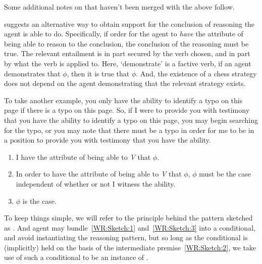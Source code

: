 \begin{note}
  {
    \color{red}
    Some additional notes on \AR{} that haven't been merged with the above follow.
  }
\end{note}

\begin{note}[Compatibility]
  \AR{} suggests an alternative way to obtain support for the conclusion of reasoning the agent is able to do.
  Specifically, if order for the agent to \emph{have} the attribute of being able to reason to the conclusion, the conclusion of the reasoning must be true.
  The relevant entailment is in part secured by the verb chosen, and in part by what the verb is applied to.
  Here, `demonstrate' is a factive verb, if an agent demonstrates that \(\phi\), then it is true that \(\phi\).
  And, the existence of a chess strategy does not depend on the agent demonstrating that the relevant strategy exists.

  To take another example, you only have the ability to identify a typo on this page if there is a typo on this page.
  So, if I were to provide you with testimony that you have the ability to identify a typo on this page, you may begin searching for the typo, or you may note that there must be a typo in order for me to be in a position to provide you with testimony that you have the ability.
\end{note}

\begin{note}[Sketch of \AR{}]
  \begin{enumerate}[label=(\textsf{A}\arabic*), ref=(\textsf{A}\arabic*)]
  \item\label{AR:Sketch:1} I have the attribute of being able to \emph{V} that \(\phi\).
  \item\label{AR:Sketch:2} In order to have the attribute of being able to \emph{V} that \(\phi\), \(\phi\) must be the case independent of whether or not I witness the ability.
  \item\label{AR:Sketch:3} \(\phi\) is the case.
  \end{enumerate}

  To keep things simple, we will refer to the principle behind the pattern sketched as \AR{}.
  And agent may bundle~\ref{WR:Sketch:1} and~\ref{WR:Sketch:3} into a conditional, and avoid instantiating the reasoning pattern, but so long as the conditional is (implicitly) held on the basis of the intermediate premise~\ref{WR:Sketch:2}, we take use of such a conditional to be an instance of \AR{}.
\end{note}


